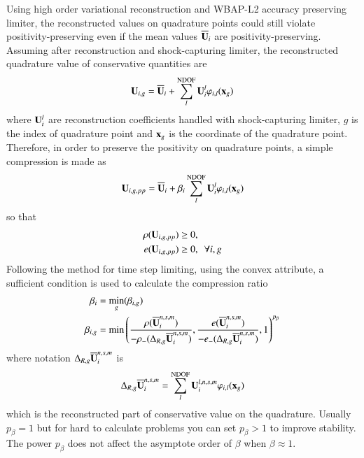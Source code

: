 \documentclass[preprint,12pt]{elsarticle}
\begin{document}
Using high order variational reconstruction and WBAP-L2
accuracy preserving limiter, the reconstructed values
on quadrature points could still violate positivity-preserving
even if the mean values $\overline{\mathbf{U}}_i$ are positivity-preserving.
Assuming after reconstruction and shock-capturing limiter,
the reconstructed quadrature value of conservative quantities are 
\begin{equation}
    \mathbf{U}_{i,g} = \overline{\mathbf{U}}_{i} + \sum_{l}^{\mathrm{NDOF}}{\mathbf{U}_i^l\varphi_{i,l}(\mathbf{x}_g)}
\end{equation}
where $\mathbf{U}_i^l$ are reconstruction coefficients 
handled with shock-capturing limiter, 
$g$ is the index of quadrature point and $\mathbf{x}_g$ is the coordinate of 
the quadrature point. 
Therefore, in order to preserve the positivity on 
quadrature points, a simple compression is made as
\begin{equation}
    \mathbf{U}_{i,g,pp} = \overline{\mathbf{U}}_{i} + \beta_i \sum_{l}^{\mathrm{NDOF}}{\mathbf{U}_i^l\varphi_{i,l}(\mathbf{x}_g)}
\end{equation}
so that 
\begin{equation}
    \begin{aligned}
        \rho(\mathbf{U}_{i,g,pp}) &\geq 0,\\
        e(\mathbf{U}_{i,g,pp}) &\geq 0 ,\ \ \forall i,g
    \end{aligned}
\end{equation}
Following the method for time step limiting, using 
the convex attribute, 
a sufficient condition is used to calculate the compression ratio
\begin{equation}
    \begin{aligned}
        \beta_{i} & = \min_g(\beta_{i,g})\\
        \beta_{i,g} & = \min\left(
            \frac{\rho(\overline{\mathbf{U}}_i^{n,s,m})}{-\rho_-(\mathrm\Delta_{R,g} \overline{\mathbf{U}}_i^{n,s,m})},
            \frac{e(\overline{\mathbf{U}}_i^{n,s,m})}{-e_-(\mathrm\Delta_{R,g} \overline{\mathbf{U}}_i^{n,s,m})},
            1
            \right)^{p_\beta}
    \end{aligned}
\end{equation}
where notation $\mathrm\Delta_{R,g} \overline{\mathbf{U}}_i^{n,s,m}$ is 
\begin{equation}
    \mathrm\Delta_{R,g} \overline{\mathbf{U}}_i^{n,s,m} = \sum_{l}^{\mathrm{NDOF}}{\mathbf{U}_i^{l,n,s,m}\varphi_{i,l}(\mathbf{x}_g)}
\end{equation}
which is the reconstructed part of conservative value on the quadrature.
Usually $p_\beta=1$ but for hard to calculate problems you can set $p_\beta>1$
to improve stability. The power $p_\beta$ does not affect 
the asymptote order of $\beta$ when $\beta\approx 1$.
\end{document}
